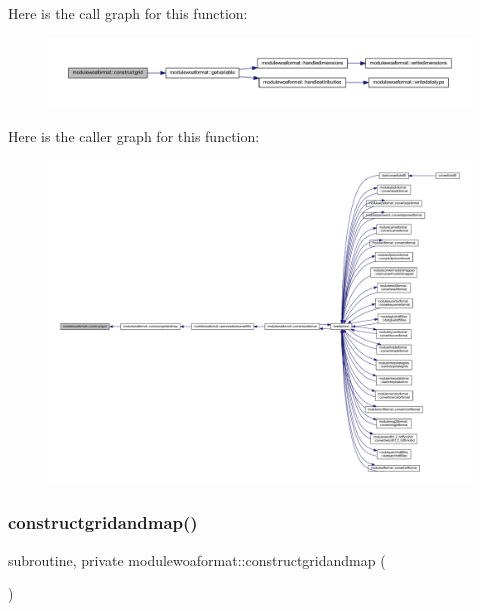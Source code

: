 Here is the call graph for this function\+:\nopagebreak
\begin{figure}[H]
\begin{center}
\leavevmode
\includegraphics[width=350pt]{namespacemodulewoaformat_a2b1ae956746e53538872b16c62bcf308_cgraph}
\end{center}
\end{figure}
Here is the caller graph for this function\+:\nopagebreak
\begin{figure}[H]
\begin{center}
\leavevmode
\includegraphics[width=350pt]{namespacemodulewoaformat_a2b1ae956746e53538872b16c62bcf308_icgraph}
\end{center}
\end{figure}
\mbox{\label{namespacemodulewoaformat_a8428b35a710ef648826b1b6b2273d34f}} 
\subsubsection{\texorpdfstring{constructgridandmap()}{constructgridandmap()}}
{\footnotesize\ttfamily subroutine, private modulewoaformat\+::constructgridandmap (\begin{DoxyParamCaption}{ }\end{DoxyParamCaption})\hspace{0.3cm}{\ttfamily [private]}}

